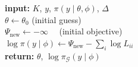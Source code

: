 \documentclass[stslayout, noinfoline]{imsart}
\theoremstyle{definition}
\begin{document}
\begin{algorithm}[!h]
    \caption{Newton solver using $B = I + W^\frac{1}{2} K W^\frac{1}{2}$}
    \label{algo:newton-B1}
      \textbf{input:} $K$, $y$, $\pi(y \mid \theta, \phi)$, $\Delta$ \\
      $\theta \gets \theta_0$ \hspace{1cm} (initial guess) \\
      $\Psi_\text{new} \gets -\infty$ \ \ (initial objective) \\
      $\log \pi(y \mid \phi) \gets \Psi_\text{new} - \sum_i \log L_{ii}$ \\
      \textbf{return:} $\theta$, $\log \pi_\mathcal{G}(y \mid \phi)$
  \end{algorithm}
\end{document}
